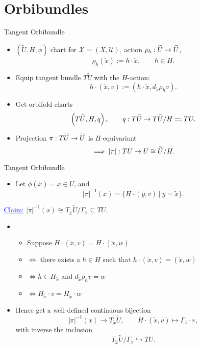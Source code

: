 \section{Orbibundles}

\begin{frame}{Tangent Orbibundle}
    \begin{itemize}
        \item $(\widetilde{U}, H, \phi)$ chart for $\mathcal{X} = (X, \mathcal{U})$, action $\rho_{h} : \widetilde{U} \rightarrow \widetilde{U}$,
        \[
            \rho_{h}(\tilde{x}) := h \cdot \tilde{x}, \qquad h \in H.  
        \]
        \item Equip tangent bundle $T\widetilde{U}$ with the $H$-action:
        \[
            h \cdot (\tilde{x}, v) := \left( h \cdot \tilde{x}, d_{\tilde{x}}\rho_{h}v \right).
        \]
        \item Get orbifold charts
        \[
            \left(T\widetilde{U}, H, q\right), \qquad q : T\widetilde{U} \rightarrow T\widetilde{U}/H =: TU.
        \]
        \item Projection $\pi : T\widetilde{U} \rightarrow \widetilde{U}$ is $H$-equivariant
        \[
            \implies |\pi| : TU \rightarrow U \cong \widetilde{U}/H.
        \]
    \end{itemize}
\end{frame}

\begin{frame}{Tangent Orbibundle}
    \begin{itemize}
        \item Let $\phi(\tilde{x}) = x \in U$, and 
        \[
            |\pi|^{-1}(x) = \{ H \cdot (y,v)\ |\ y = \tilde{x} \}.
        \]
    \end{itemize}
    \textcolor{blue}{\underline{Claim:}} $|\pi|^{-1}(x) \cong T_{\tilde{x}}\widetilde{U}/\Gamma_{x} \subseteq TU$.
        \begin{itemize}
            \item
            \begin{itemize}
                \item Suppose $H \cdot (\tilde{x},v) = H \cdot (\tilde{x}, w)$
                \item $\iff$ there exists a $h \in H$ such that $h \cdot (\tilde{x},v) = (\tilde{x},w)$
                \item $\iff h \in H_{\tilde{x}}$ and $d_{\tilde{x}}\rho_{h} v = w$
                \item $\iff H_{\tilde{x}} \cdot v = H_{\tilde{x}} \cdot w$
            \end{itemize}
            \item Hence get a well-defined continuous bijection
            \[
                |\pi|^{-1}(x) \rightarrow T_{\tilde{x}}\widetilde{U}, \qquad H \cdot (\tilde{x}, v) \mapsto \Gamma_{x} \cdot v,
            \]
            with inverse the inclusion
            \[
                T_{\tilde{x}}\widetilde{U}/\Gamma_{x} \hookrightarrow TU.    
            \]
        \end{itemize}
\end{frame}

